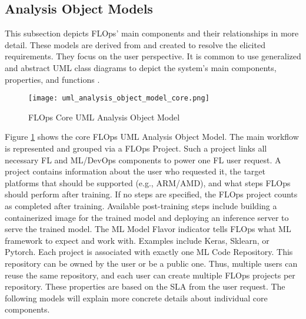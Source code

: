 \subsection{Analysis Object Models}

This subsection depicts FLOps' main components and their relationships in more detail.
These models are derived from and created to resolve the elicited requirements.
They focus on the user perspective.
It is common to use generalized and abstract UML class diagrams to depict the system's main components, properties, and functions \cite{book:bruegge}.

\begin{figure}[h]
    \centering
    \texttt{[image: uml\_analysis\_object\_model\_core.png]}
    \caption{FLOps Core UML Analysis Object Model}
    \label{fig:uml_core_analysis_object_model}
\end{figure}

Figure \ref{fig:uml_core_analysis_object_model} shows the core FLOps UML Analysis Object Model.
The main workflow is represented and grouped via a FLOps Project.
Such a project links all necessary FL and ML/DevOps components to power one FL user request.
A project contains information about the user who requested it, the target platforms that should be supported (e.g., ARM/AMD), and what steps FLOps should perform after training.
If no steps are specified, the FLOps project counts as completed after training.
Available post-training steps include building a containerized image for the trained model and deploying an inference server to serve the trained model.
The ML Model Flavor indicator tells FLOps what ML framework to expect and work with.
Examples include Keras, Sklearn, or Pytorch.
Each project is associated with exactly one ML Code Repository.
This repository can be owned by the user or be a public one.
Thus, multiple users can reuse the same repository, and each user can create multiple FLOps projects per repository.
These properties are based on the SLA from the user request. 
The following models will explain more concrete details about individual core components.

